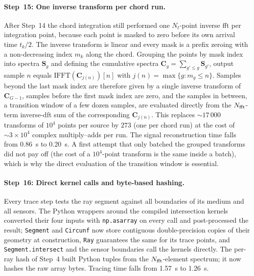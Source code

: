             \paragraph*{Step~15: One inverse transform per chord run.}
            After Step~14 the chord integration still performed one $N_t$-point inverse \acrshort{fft} per integration point, because each point is masked to zero before its own arrival time $t_k/2$. The inverse transform is linear and every mask is a prefix zeroing with a non-decreasing index $m_k$ along the chord. Grouping the points by mask index into spectra $\mathbf{S}_g$ and defining the cumulative spectra $\mathbf{C}_g = \sum_{g' \le g} \mathbf{S}_{g'}$, output sample $n$ equals $\mathrm{IFFT}(\mathbf{C}_{j(n)})[n]$ with $j(n) = \max\{g : m_g \le n\}$. Samples beyond the last mask index are therefore given by a single inverse transform of $\mathbf{C}_{G-1}$, samples before the first mask index are zero, and the samples in between, a transition window of a few dozen samples, are evaluated directly from the $N_{\rm fft}$-term inverse-\acrshort{dft} sum of the corresponding $\mathbf{C}_{j(n)}$. This replaces $\sim 17\,000$ transforms of $10^4$ points per source by $273$ (one per chord run) at the cost of $\sim 3\times10^{4}$ complex multiply--adds per run. The signal reconstruction time falls from \SI{0.86}{\second} to \SI{0.20}{\second}. A first attempt that only batched the grouped transforms did not pay off (the cost of a $10^4$-point transform is the same inside a batch), which is why the direct evaluation of the transition window is essential.

            \paragraph*{Step~16: Direct kernel calls and byte-based hashing.}
            Every trace step tests the ray segment against all boundaries of its medium and all sensors. The Python wrappers around the compiled intersection kernels converted their four inputs with \texttt{np.asarray} on every call and post-processed the result; \texttt{Segment} and \texttt{Circunf} now store contiguous double-precision copies of their geometry at construction, \texttt{Ray} guarantees the same for its trace points, and \texttt{Segment.intersect} and the sensor boundaries call the kernels directly. The per-ray hash of Step~4 built Python tuples from the $N_{\rm fft}$-element spectrum; it now hashes the raw array bytes. Tracing time falls from \SI{1.57}{\second} to \SI{1.26}{\second}.

